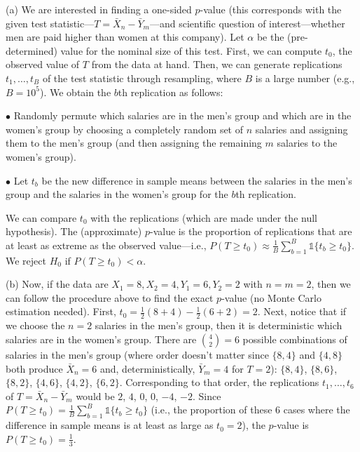 \documentclass[12pt,oneside]{article}
\newcommand{\indic}{\mathds{1}}
\theoremstyle{definition}
\theoremstyle{remark}
\begin{document}
\begin{solutionbox}
(a) We are interested in finding a one-sided $p$-value (this corresponds with the given test statistic—$T = \bar{X}_n - \bar{Y}_m$—and scientific question of interest—whether men are paid higher than women at this company). Let $\alpha$ be the (pre-determined) value for the nominal size of this test. First, we can compute $t_0$, the observed value of $T$ from the data at hand. Then, we can generate replications $t_1, \ldots, t_B$ of the test statistic through resampling, where $B$ is a large number (e.g., $B = 10^5$). We obtain the $b$th replication as follows:

$\bullet$ Randomly permute which salaries are in the men's group and which are in the women's group by choosing a completely random set of $n$ salaries and assigning them to the men's group (and then assigning the remaining $m$ salaries to the women's group).

$\bullet$ Let $t_b$ be the new difference in sample means between the salaries in the men's group and the salaries in the women's group for the $b$th replication.

We can compare $t_0$ with the replications (which are made under the null hypothesis). The (approximate) $p$-value is the proportion of replications that are at least as extreme as the observed value—i.e., $P(T \geq t_0) \approx \frac{1}{B} \sum_{b = 1}^{B} \indic\{t_b \geq t_0\}$. We reject $H_0$ if $P(T \geq t_0) < \alpha$.

(b) Now, if the data are $X_1 = 8, X_2 = 4, Y_1 = 6, Y_2 = 2$ with $n = m = 2$, then we can follow the procedure above to find the exact $p$-value (no Monte Carlo estimation needed). First, $t_0 = \frac{1}{2}(8 + 4) - \frac{1}{2}(6 + 2) = 2$. Next, notice that if we choose the $n = 2$ salaries in the men's group, then it is deterministic which salaries are in the women's group. There are $\binom{4}{2} = 6$ possible combinations of salaries in the men's group (where order doesn't matter since $\{8, 4\}$ and $\{4, 8\}$ both produce $\bar{X}_n = 6$ and, deterministically, $\bar{Y}_m = 4$ for $T = 2$): $\{8, 4\}$, $\{8, 6\}$, $\{8, 2\}$, $\{4, 6\}$, $\{4, 2\}$, $\{6, 2\}$. Corresponding to that order, the replications $t_1, \ldots, t_6$ of $T = \bar{X}_n - \bar{Y}_m$ would be $2$, $4$, $0$, $0$, $-4$, $-2$. Since $P(T \geq t_0) = \frac{1}{B} \sum_{b = 1}^{B} \indic\{t_b \geq t_0\}$ (i.e., the proportion of these $6$ cases where the difference in sample means is at least as large as $t_0 = 2$), the $p$-value is $P(T \geq t_0) = \frac{1}{3}$. 
\end{solutionbox}
\end{document}
